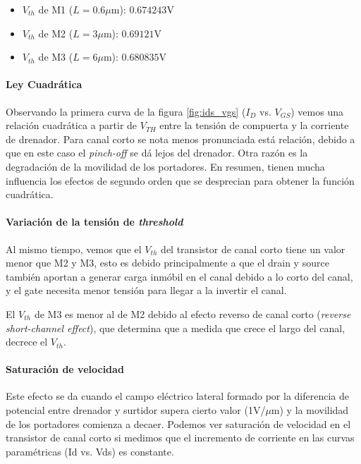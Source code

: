 \begin{itemize}
	\item $V_{th}$ de M1 ($L=0.6\mu$m): $0.674243$V
	\item $V_{th}$ de M2 ($L=3\mu$m): $0.69121$V
	\item $V_{th}$ de M3 ($L=6\mu$m): $0.680835$V
\end{itemize}

\paragraph{Ley Cuadrática}

Observando la primera curva de la figura \ref{fig:ids_vgs} ($I_D$ vs. $V_{GS}$) vemos una relación cuadrática a partir de $V_{TH}$ entre la tensión de compuerta y la corriente de drenador. Para canal corto se nota menos pronunciada está relación, debido a que en este caso el \emph{pinch-off} se dá lejos del drenador. Otra razón es la degradación de la movilidad de los portadores. En resumen, tienen mucha influencia los efectos de segundo orden que se desprecian para obtener la función cuadrática. 

\paragraph{Variación de la tensión de \emph{threshold}}
Al mismo tiempo, vemos que el $V_{th}$ del transistor de canal corto tiene un valor menor que M2 y M3, esto es debido principalmente a que el drain y source también aportan a generar carga inmóbil en el canal debido a lo corto del canal, y el gate necesita menor tensión para llegar a la invertir el canal. 

El $V_{th}$ de M3 es menor al de M2 debido al efecto reverso de canal corto (\emph{reverse short-channel effect}), que determina que a medida que crece el largo del canal, decrece el $V_{th}$.

\paragraph{Saturación de velocidad}
Este efecto se da cuando el campo eléctrico lateral formado por la diferencia de potencial entre drenador y surtidor supera cierto valor (1V/$\mu$m) y la movilidad de los portadores comienza a decaer. Podemos ver saturación de velocidad en el transistor de canal corto si medimos que el incremento de corriente en las curvas paramétricas (Id vs. Vds) es constante.  






